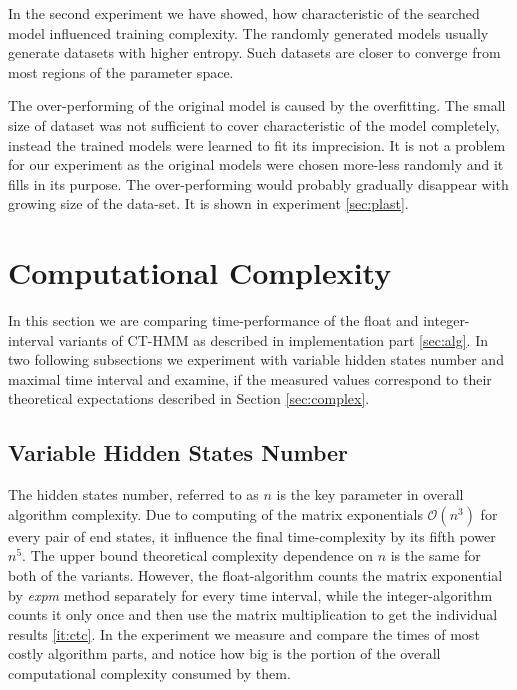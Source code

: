 \documentclass[thesis=M,english]{FITthesis}[2012/10/20]
\begin{document}
In the second experiment we have showed, how characteristic of the searched model influenced training complexity. The randomly generated models usually generate datasets with higher entropy. Such datasets are closer to converge from most regions of the parameter space. 

The over-performing of the original model is caused by the overfitting. The small size of dataset was not sufficient to cover characteristic of the model completely, instead the trained models were learned to fit its imprecision. It is not a problem for our experiment as the original models were chosen more-less randomly and it fills in its purpose. The over-performing would probably gradually disappear with growing size of the data-set. It is shown in experiment \ref{sec:plast}.



\section{Computational Complexity}\label{sec:cc}

In this section we are comparing time-performance of the float and integer-interval variants of CT-HMM  as described in implementation part \ref{sec:alg}.
In two following subsections we experiment with variable hidden states number and maximal time interval and examine, if the measured values correspond to their theoretical expectations described in Section \ref{sec:complex}.

\subsection{Variable Hidden States Number}

The hidden states number, referred to as $n$ is the key parameter in overall algorithm complexity. Due to computing of the matrix exponentials $\mathcal{O}(n^3)$ for every pair of end states, it influence the final time-complexity by its fifth power $n^5$. The upper bound theoretical complexity dependence on $n$ is the same for both of the variants. However, the float-algorithm counts the matrix exponential by \textit{expm} method separately for every time interval, while the integer-algorithm counts it only once and then use the matrix multiplication to get the individual results \ref{it:ctc}. In the experiment we measure and compare the times of most costly algorithm parts, and notice how big is the portion of the overall computational complexity consumed by them. 
\end{document}
